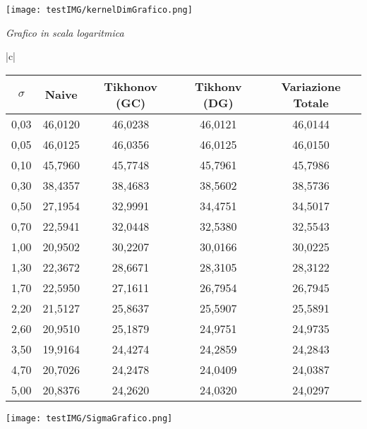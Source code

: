 \documentclass{article}
\begin{document}
\hskip-2.5cm\texttt{[image: testIMG/kernelDimGrafico.png]} \\ 

\begin{center}
    \textit{Grafico in scala logaritmica}
\end{center}


\vspace*{20px}

\begin{tabular}{ |c|}
\hline
{} \\
\hline
\begin{tabular}{c|c|c|c|c}
$\sigma$ &	Naive & Tikhonov (GC) & Tikhonv (DG) & Variazione Totale\\
\hline
0,03 & 46,0120 & 46,0238 & 46,0121 & 46,0144 \\
0,05 & 46,0125 & 46,0356 & 46,0125 & 46,0150 \\
0,10 & 45,7960 & 45,7748 & 45,7961 & 45,7986 \\
0,30 & 38,4357 & 38,4683 & 38,5602 & 38,5736 \\
0,50 & 27,1954 & 32,9991 & 34,4751 & 34,5017 \\
0,70 & 22,5941 & 32,0448 & 32,5380 & 32,5543 \\
1,00 & 20,9502 & 30,2207 & 30,0166 & 30,0225 \\
1,30 & 22,3672 & 28,6671 & 28,3105 & 28,3122 \\
1,70 & 22,5950 & 27,1611 & 26,7954 & 26,7945 \\
2,20 & 21,5127 & 25,8637 & 25,5907 & 25,5891 \\
2,60 & 20,9510 & 25,1879 & 24,9751 & 24,9735 \\
3,50 & 19,9164 & 24,4274 & 24,2859 & 24,2843 \\
4,70 & 20,7026 & 24,2478 & 24,0409 & 24,0387 \\
5,00 & 20,8376 & 24,2620 & 24,0320 & 24,0297 \\
\hline
\end{tabular}
\end{tabular}

\begin{center}
\texttt{[image: testIMG/SigmaGrafico.png]}
\end{center}
\end{document}
